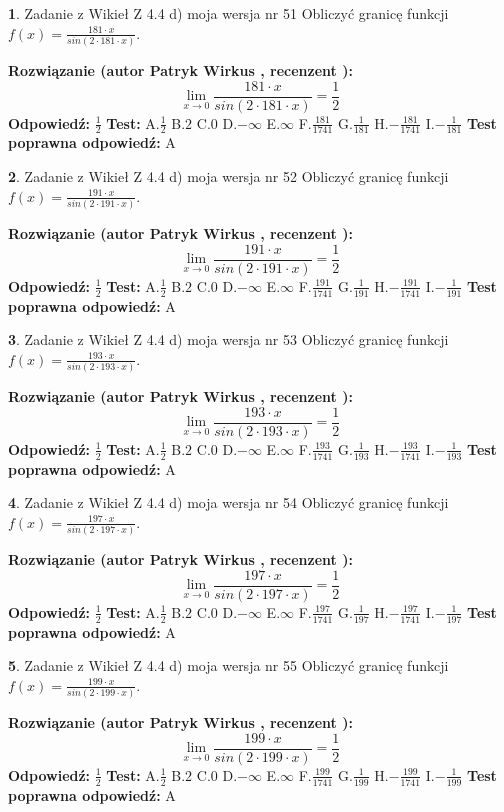 \documentclass[12pt, a4paper]{article}
\theoremstyle{definition} %
\newtheorem{zad}{}
\newcommand{\zadStart}[1]{\begin{zad}#1\newline}
\newcommand{\zadStop}{\end{zad}}
\newcommand{\rozwStart}[2]{\noindent \textbf{Rozwiązanie (autor #1 , recenzent #2): }\newline}
\newcommand{\rozwStop}{\newline}
\newcommand{\odpStart}{\noindent \textbf{Odpowiedź:}\newline}
\newcommand{\odpStop}{\newline}
\newcommand{\testStart}{\noindent \textbf{Test:}\newline}
\newcommand{\testStop}{\newline}
\newcommand{\kluczStart}{\noindent \textbf{Test poprawna odpowiedź:}\newline}
\newcommand{\kluczStop}{\newline}
\begin{document}
\zadStart{Zadanie z Wikieł Z 4.4 d) moja wersja nr 51}
Obliczyć granicę funkcji $f(x)=\frac{181\cdot x}{sin(2 \cdot181\cdot x)}$.
\zadStop
\rozwStart{Patryk Wirkus}{}
$$\lim\limits_{x\to 0}\frac{181\cdot x}{sin(2 \cdot181\cdot x)}=\frac{1}{2}$$
\rozwStop
\odpStart
$\frac{1}{2}$
\odpStop
\testStart
A.$\frac{1}{2}$
B.$2$
C.$0$
D.$-\infty$
E.$\infty$
F.$\frac{181}{1741}$
G.$\frac{1}{181}$
H.$-\frac{181}{1741}$
I.$-\frac{1}{181}$
\testStop
\kluczStart
A
\kluczStop



\zadStart{Zadanie z Wikieł Z 4.4 d) moja wersja nr 52}
Obliczyć granicę funkcji $f(x)=\frac{191\cdot x}{sin(2 \cdot191\cdot x)}$.
\zadStop
\rozwStart{Patryk Wirkus}{}
$$\lim\limits_{x\to 0}\frac{191\cdot x}{sin(2 \cdot191\cdot x)}=\frac{1}{2}$$
\rozwStop
\odpStart
$\frac{1}{2}$
\odpStop
\testStart
A.$\frac{1}{2}$
B.$2$
C.$0$
D.$-\infty$
E.$\infty$
F.$\frac{191}{1741}$
G.$\frac{1}{191}$
H.$-\frac{191}{1741}$
I.$-\frac{1}{191}$
\testStop
\kluczStart
A
\kluczStop



\zadStart{Zadanie z Wikieł Z 4.4 d) moja wersja nr 53}
Obliczyć granicę funkcji $f(x)=\frac{193\cdot x}{sin(2 \cdot193\cdot x)}$.
\zadStop
\rozwStart{Patryk Wirkus}{}
$$\lim\limits_{x\to 0}\frac{193\cdot x}{sin(2 \cdot193\cdot x)}=\frac{1}{2}$$
\rozwStop
\odpStart
$\frac{1}{2}$
\odpStop
\testStart
A.$\frac{1}{2}$
B.$2$
C.$0$
D.$-\infty$
E.$\infty$
F.$\frac{193}{1741}$
G.$\frac{1}{193}$
H.$-\frac{193}{1741}$
I.$-\frac{1}{193}$
\testStop
\kluczStart
A
\kluczStop



\zadStart{Zadanie z Wikieł Z 4.4 d) moja wersja nr 54}
Obliczyć granicę funkcji $f(x)=\frac{197\cdot x}{sin(2 \cdot197\cdot x)}$.
\zadStop
\rozwStart{Patryk Wirkus}{}
$$\lim\limits_{x\to 0}\frac{197\cdot x}{sin(2 \cdot197\cdot x)}=\frac{1}{2}$$
\rozwStop
\odpStart
$\frac{1}{2}$
\odpStop
\testStart
A.$\frac{1}{2}$
B.$2$
C.$0$
D.$-\infty$
E.$\infty$
F.$\frac{197}{1741}$
G.$\frac{1}{197}$
H.$-\frac{197}{1741}$
I.$-\frac{1}{197}$
\testStop
\kluczStart
A
\kluczStop



\zadStart{Zadanie z Wikieł Z 4.4 d) moja wersja nr 55}
Obliczyć granicę funkcji $f(x)=\frac{199\cdot x}{sin(2 \cdot199\cdot x)}$.
\zadStop
\rozwStart{Patryk Wirkus}{}
$$\lim\limits_{x\to 0}\frac{199\cdot x}{sin(2 \cdot199\cdot x)}=\frac{1}{2}$$
\rozwStop
\odpStart
$\frac{1}{2}$
\odpStop
\testStart
A.$\frac{1}{2}$
B.$2$
C.$0$
D.$-\infty$
E.$\infty$
F.$\frac{199}{1741}$
G.$\frac{1}{199}$
H.$-\frac{199}{1741}$
I.$-\frac{1}{199}$
\testStop
\kluczStart
A
\kluczStop
\end{document}
